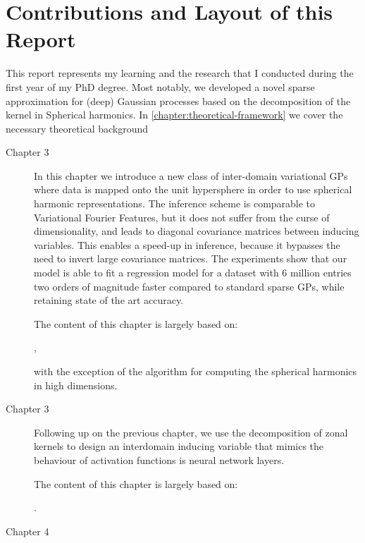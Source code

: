 \section{Contributions and Layout of this Report}

This report represents my learning and the research that I conducted during the first year of my PhD degree. Most notably, we developed a novel sparse approximation for (deep) Gaussian processes based on the decomposition of the kernel in Spherical harmonics. In \cref{chapter:theoretical-framework} we cover the necessary theoretical background 

\begin{description}
    \item[Chapter 3] In this chapter we introduce a new class of inter-domain variational GPs where data is mapped onto the unit hypersphere in order to use spherical harmonic representations. The inference scheme is comparable to Variational Fourier Features, but it does not suffer from the curse of dimensionality, and leads to diagonal covariance matrices between inducing variables. This enables a speed-up in inference, because it bypasses the need to invert large covariance matrices. The experiments show that our model is able to fit a regression model for a dataset with 6 million entries two orders of magnitude faster compared to standard sparse GPs, while retaining state of the art accuracy.
    
    The content of this chapter is largely based on:

    ,

    with the exception of the algorithm for computing the spherical harmonics in high dimensions.

    \item[Chapter 3] Following up on the previous chapter, we use the decomposition of zonal kernels to design an interdomain inducing variable that mimics the behaviour of activation functions is neural network layers. 

    The content of this chapter is largely based on:

    .

    \item[Chapter 4]
\end{description}

